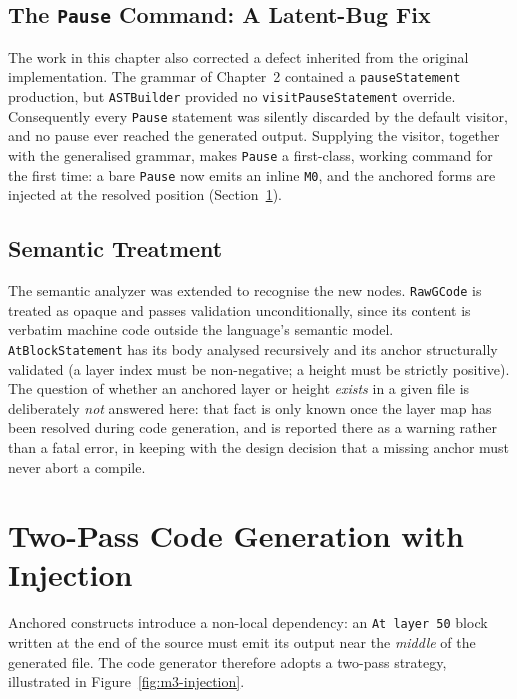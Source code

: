 \subsection*{The \texttt{Pause} Command: A Latent-Bug Fix}

The work in this chapter also corrected a defect inherited from the original implementation. The grammar of Chapter~2 contained a \texttt{pauseStatement} production, but \texttt{ASTBuilder} provided no \texttt{visitPauseStatement} override. Consequently every \texttt{Pause} statement was silently discarded by the default visitor, and no pause ever reached the generated output. Supplying the visitor, together with the generalised grammar, makes \texttt{Pause} a first-class, working command for the first time: a bare \texttt{Pause} now emits an inline \texttt{M0}, and the anchored forms are injected at the resolved position (Section~\ref{sec:m3-injection}).

\subsection*{Semantic Treatment}

The semantic analyzer was extended to recognise the new nodes. \texttt{RawGCode} is treated as opaque and passes validation unconditionally, since its content is verbatim machine code outside the language's semantic model. \texttt{AtBlockStatement} has its body analysed recursively and its anchor structurally validated (a layer index must be non-negative; a height must be strictly positive). The question of whether an anchored layer or height \emph{exists} in a given file is deliberately \emph{not} answered here: that fact is only known once the layer map has been resolved during code generation, and is reported there as a warning rather than a fatal error, in keeping with the design decision that a missing anchor must never abort a compile.

\section{Two-Pass Code Generation with Injection}
\label{sec:m3-injection}

Anchored constructs introduce a non-local dependency: an \texttt{At layer 50} block written at the end of the source must emit its output near the \emph{middle} of the generated file. The code generator therefore adopts a two-pass strategy, illustrated in Figure~\ref{fig:m3-injection}.

